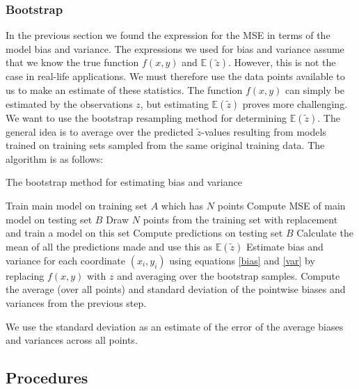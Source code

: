 \documentclass[notitlepage, reprint, nofootinbib]{revtex4-1}
\begin{document}
\subsubsection{Bootstrap}
In the previous section we found the expression for the MSE in terms of the model bias and variance. The expressions we used for bias and variance assume that we know the true function $f(x,y)$ and $\mathbb{E}(\tilde{z})$. However, this is not the case in real-life applications. We must therefore use the data points available to us to make an estimate of these statistics. The function $f(x,y)$ can simply be estimated by the observations $z$, but estimating $\mathbb{E}(\tilde{z})$ proves more challenging.\\[2mm]
We want to use the bootstrap resampling method for determining $\mathbb{E}(\tilde{z})$. The general idea is to average over the predicted $\tilde{z}$-values resulting from models trained on training sets sampled from the same original training data. The algorithm is as follows: 
\begin{algorithm}[H]
	\caption{The bootstrap method for estimating bias and variance}
	\begin{algorithmic}[1]
		\State Train main model on training set $A$ which has $N$ points 
		\State Compute MSE of main model on testing set $B$ 
			\State Draw $N$ points from the training set with replacement and train a model on this set 
			\State Compute predictions on testing set $B$	
		\EndFor
		\State Calculate the mean of all the predictions made and use this as $\mathbb{E}(\tilde{z})$
		\State Estimate bias and variance for each coordinate $(x_i,y_i)$ using equations \ref{bias} and \ref{var} by replacing $f(x,y)$ with $z$ and averaging over the bootstrap samples.
		\State Compute the average (over all points) and standard deviation of the pointwise biases and variances from the previous step. 
	\end{algorithmic}
\end{algorithm}
We use the standard deviation as an estimate of the error of the average biases and variances across all points.

\subsection{Procedures}
\end{document}
